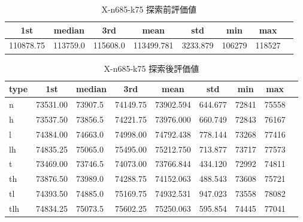 \begin{table}[htbp]
    \caption{X-n685-k75 探索前評価値}
    \begin{tabular}{|l|l|l|l|l|l|l|l|}\hline
    \multicolumn{1}{|c|}{\textbf{1st}}
    &\multicolumn{1}{c|}{\textbf{median}}
    &\multicolumn{1}{c|}{\textbf{3rd}}
    &\multicolumn{1}{c|}{\textbf{mean}}
    &\multicolumn{1}{c|}{\textbf{std}}
    &\multicolumn{1}{c|}{\textbf{min}}
    &\multicolumn{1}{c|}{\textbf{max}}\\\hline
	110878.75 & 113759.0 & 115608.0 & 113499.781 & 3233.879 & 106279 & 118527\\\hline
	\end{tabular}
\end{table}
\begin{table}[htbp]
    \caption{X-n685-k75 探索後評価値}
    \begin{tabular}{|l|l|l|l|l|l|l|l|l|}\hline
    \multicolumn{1}{|c|}{\textbf{type}}
    &\multicolumn{1}{|c|}{\textbf{1st}}
    &\multicolumn{1}{c|}{\textbf{median}}
    &\multicolumn{1}{c|}{\textbf{3rd}}
    &\multicolumn{1}{c|}{\textbf{mean}}
    &\multicolumn{1}{c|}{\textbf{std}}
    &\multicolumn{1}{c|}{\textbf{min}}
    &\multicolumn{1}{c|}{\textbf{max}}\\\hline
	n & 73531.00 & 73907.5 & 74149.75 & 73902.594 & 644.677 & 72841 & 75558\\\hline
	h & 73537.50 & 73856.5 & 74221.75 & 73976.000 & 660.749 & 72843 & 76167\\\hline
	l & 74384.00 & 74663.0 & 74998.00 & 74792.438 & 778.144 & 73268 & 77416\\\hline
	lh & 74835.25 & 75065.0 & 75495.00 & 75212.750 & 713.877 & 73717 & 77573\\\hline
	t & 73469.00 & 73746.5 & 74073.00 & 73766.844 & 434.120 & 72992 & 74811\\\hline
	th & 73876.50 & 73989.0 & 74288.75 & 74152.063 & 488.543 & 73608 & 75721\\\hline
	tl & 74393.50 & 74885.0 & 75169.75 & 74932.531 & 947.023 & 73558 & 78082\\\hline
	tlh & 74834.25 & 75073.5 & 75602.25 & 75250.063 & 595.854 & 74445 & 77041\\\hline
	\end{tabular}
\end{table}

